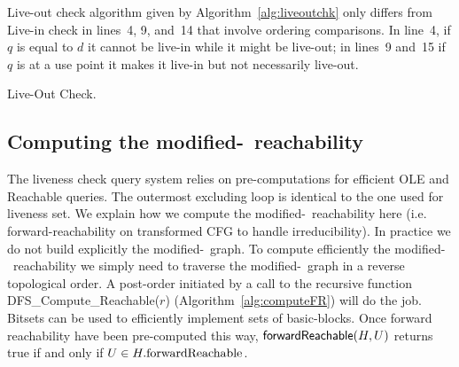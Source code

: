 Live-out check algorithm given by Algorithm~\ref{alg:liveoutchk} only differs from Live-in check in lines~4, 9, and~14 that involve ordering comparisons.
In line~4, if $q$ is equal to $d$ it cannot be live-in while it might be live-out; in lines~9 and~15 if $q$ is at a use point it makes it live-in but not necessarily live-out.

\begin{algorithm}
  \caption{Live-Out Check.}
  \label{alg:liveoutchk}
\end{algorithm}


\subsection{Computing the modified-\reduced\ reachability}

The liveness check query system relies on pre-computations for efficient \textsf{OLE} and \textsf{{\reduced}Reachable} queries.
The outermost excluding loop is identical to the one used for liveness set.
We explain how we compute the modified-\reduced\ reachability here (i.e. forward-reachability on transformed CFG to handle irreducibility).
In practice we do not build explicitly the modified-\reduced\ graph.
To compute efficiently the modified-\reduced\ reachability we simply need to traverse the modified-\reduced\ graph in a reverse topological order.
A post-order initiated by a call to the recursive function \textsf{DFS\_Compute\_{\reduced}Reachable}($r$) (Algorithm~\ref{alg:computeFR}) will do the job.
Bitsets can be used to efficiently implement sets of basic-blocks.
Once forward reachability have been pre-computed this way, $\textsf{{forward}Reachable}(H,U)$ returns true if and only if $U\in H.\textrm{{forward}Reachable}$.

